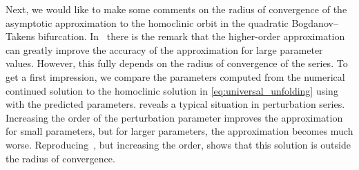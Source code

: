 Next, we would like to make some comments on the radius of convergence of the
asymptotic approximation to the homoclinic orbit in the quadratic
Bogdanov--Takens bifurcation. In~\cite{Algaba_2019} there is the remark that the
higher-order approximation can greatly improve the accuracy of the
approximation for large parameter values. However, this fully depends
on the radius of convergence of the series. To get a first impression, we
compare the parameters computed from the numerical continued solution to the
homoclinic solution in \cref{eq:universal_unfolding} using \MATCONT with the
predicted parameters.  reveals 
a typical situation  in perturbation series. Increasing the order of the
perturbation parameter improves the approximation for small parameters, but for
larger parameters, the approximation becomes much worse. Reproducing~\cite[Fig
3c]{Algaba_2019}, but increasing the order, shows that this solution is outside
the radius of convergence.

